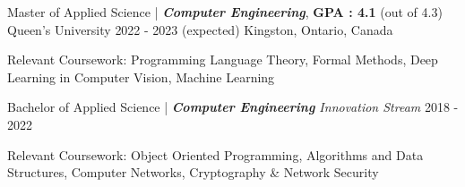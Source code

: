 

\begin{cventries}

  \cventry
    {Master of Applied Science | \textit{\textbf{Computer Engineering}}, \textbf{GPA : 4.1} (out of 4.3)} %
    {Queen's University} %
    {2022 - 2023 (expected)} %
    {Kingston, Ontario, Canada} %
    {
    \begin{cvitems} %
        \item {Relevant Coursework: Programming Language Theory, Formal Methods, Deep Learning in Computer Vision, Machine Learning}
      \end{cvitems}
    }
  \cventry
    {Bachelor of Applied Science | \textit{\textbf{Computer Engineering} Innovation Stream}} %
    {} %
    {2018 - 2022} %
    {} %
    {
    \begin{cvitems} %
        \item {Relevant Coursework: Object Oriented Programming, Algorithms and Data Structures, Computer Networks, Cryptography \& Network Security} %
      \end{cvitems}
    }
    \cventry{}{}{}{}{}
\end{cventries}
